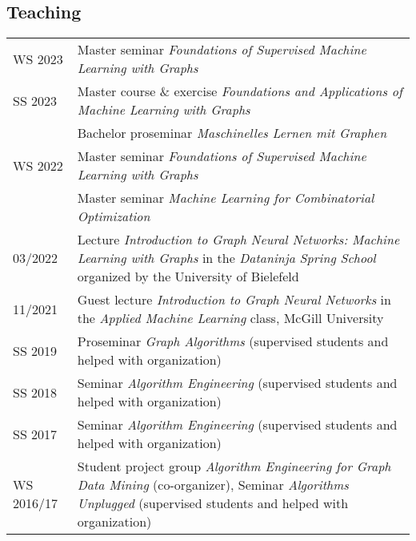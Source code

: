 \documentclass[11pt, a4paper, DIV=14, headings=small]{scrartcl}
\begin{document}
	\subsection*{Teaching}
	\begin{longtabu}{p{2.1cm}p{12.0cm}}
		WS 2023    & Master seminar \emph{Foundations of Supervised Machine Learning with Graphs}                                                                                                    \\
		SS 2023    & Master course \& exercise \emph{Foundations and Applications of Machine Learning with Graphs}                                                                                   \\
		& Bachelor proseminar \emph{Maschinelles Lernen mit Graphen}                                                                                                                      \\
		WS 2022    & Master seminar \emph{Foundations of Supervised Machine Learning with Graphs}                                                                                                    \\
		& Master seminar \emph{Machine Learning for Combinatorial Optimization}                                                                                                           \\
		03/2022    & Lecture \emph{Introduction to Graph Neural Networks: Machine Learning with Graphs} in the \emph{Dataninja Spring School} organized by the University of Bielefeld               \\
		11/2021    & Guest lecture \emph{Introduction to Graph Neural Networks} in the \emph{Applied Machine Learning} class, McGill University                                                      \\
		SS 2019    & Proseminar \emph{Graph Algorithms} (supervised students and helped with organization)                                                                                           \\
		SS 2018    & Seminar \emph{Algorithm Engineering} (supervised students and helped with organization)                                                                                         \\
		SS 2017    & Seminar \emph{Algorithm Engineering} (supervised students and helped with organization)                                                                                         \\
		WS 2016/17 & Student project group \emph{Algorithm Engineering for Graph Data Mining} (co-organizer), Seminar \emph{Algorithms Unplugged} (supervised students and helped with organization) \\

\end{longtabu}
\end{document}
